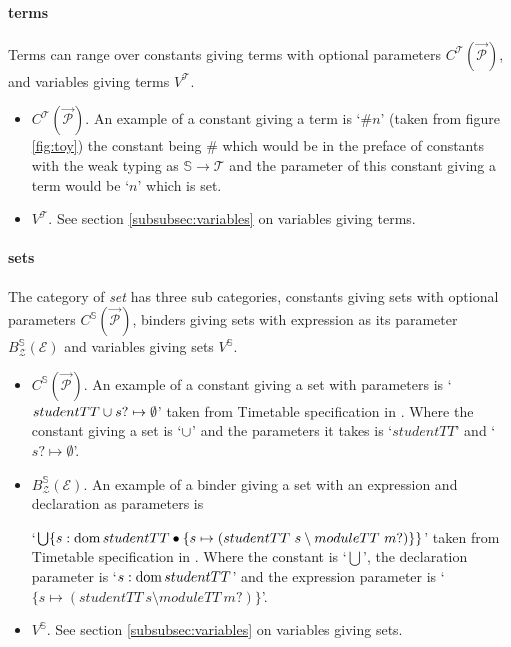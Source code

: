 \paragraph{terms}
\label{subsubsec:terms}

Terms can range over constants giving terms with optional parameters
$C^{\mathcal{T}}(\overrightarrow{\mathcal{P}})$, and variables giving terms
$V^{\mathcal{T}}$.

\begin{itemize}
\item $C^{\mathcal{T}}(\overrightarrow{\mathcal{P}})$. An example of a constant
giving a term is `$\# n$' (taken from figure \ref{fig:toy}) the constant being
$\#$ which would be in the preface of constants with the weak typing as
$\mathbb{S} \rightarrow \mathcal{T}$ and the parameter of this constant giving a
term would be `$n$' which is set.

\item $V^{\mathcal{T}}$. See section \ref{subsubsec:variables} on variables
giving terms.
\end{itemize}

\paragraph{sets}
\label{subsubsec:sets}

The category of \emph{set} has three sub categories, constants giving sets with
optional parameters $C^{\mathbb{S}}(\overrightarrow{\mathcal{P}})$, binders
giving sets with expression as its parameter
$B^{\mathbb{S}}_{\mathcal{Z}}(\mathcal{E})$ and variables giving sets
$V^{\mathbb{S}}$.

\begin{itemize}
\item $C^{\mathbb{S}}(\overrightarrow{\mathcal{P}})$. An example of a constant
giving a set with parameters is
\newline
`$studentTT \cup {s? \mapsto \emptyset}$'
\newline
taken from Timetable specification in \cite{essenceofz}. Where the
constant giving a set is `$\cup$' and the parameters it takes is `$studentTT$'
and `${s? \mapsto \emptyset}$'.

\item $B^{\mathbb{S}}_{\mathcal{Z}}(\mathcal{E})$. An example of a binder giving
a set with an expression and declaration as parameters is
\newline

`$\bigcup \{s:\mathop{\mathrm{dom}} studentTT \bullet \{s \mapsto (studentTT~s \setminus
moduleTT~m?)\}\}$' \newline
taken from Timetable specification in \cite{essenceofz}. Where the
constant is `$\bigcup$', the declaration parameter is `$s:\mathop{\mathrm{dom}} studentTT $' and
the expression parameter is `$  \{s \mapsto (studentTT~s \setminus
moduleTT~m?)\}$'.

\item $V^{\mathbb{S}}$. See section \ref{subsubsec:variables} on variables
giving sets.
\end{itemize}

